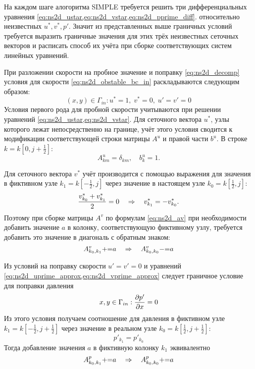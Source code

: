 На каждом шаге алогоритма SIMPLE требуется
решить три дифференциальных уравнения \cref{eq:ns2d_ustar,eq:ns2d_vstar,eq:ns2d_pprime_diff}.
относительно неизвестных $u^*, v^*, p'$.
Значит из представленных выше граничных условий требуется
выразить граничные значения для этих трёх неизвестных сеточных векторов
и расписать способ их учёта при сборке соответствующих систем линейных уравнений.

\label{sec:obstacle_bc_input}
При разложении скорости на пробное значение и поправку \cref{eq:ns2d_decomp}
условия для скорости \cref{eq:ns2d_obstable_bc_in} раскладываются следующим образом:
\begin{equation}
\label{eq:ns2d_decomp_input}
(x,y) \in \Gamma_{in}: u^* = 1, \; v^* = 0, \; u' = v' = 0
\end{equation}
Условия первого рода для пробной скорости учитываются при решении уравнений
\cref{eq:ns2d_ustar,eq:ns2d_vstar}.
Для сеточного вектора $u^*$, узлы которого лежат непосредственно на границе,
учёт этого условия сводится к модификации соответствующей строки матрицы $A^u$ и правой части $b^u$.
В строке $k=k\left[0, j+\tfrac12\right]$:
\begin{equation}
\label{eq:ns2d_au_bc_left}
A^u_{km} = \delta_{km}, \quad b^u_k = 1.
\end{equation}

Для сеточного вектора $v^*$ учёт производится с помощью выражения для значения в фиктивном узле $k_1 = k\left[-\tfrac12, j\right]$
через значение в настоящем узле $k_0 = k\left[\tfrac12, j\right]$:
$$
\frac{v^*_{k_0} + v^*_{k_1}}{2} = 0 \quad\Rightarrow\quad v^*_{k_1} = -v^*_{k_0}.
$$
Поэтому при сборке матрицы $A^v$ по формулам \cref{eq:ns2d_av} при необходимости добавить
значение $a$ в колонку, соответствующую фиктивному узлу, требуется добавить это значение
в диагональ с обратным знаком:
\begin{equation}
\label{eq:ns2d_av_bc_left}
A^v_{k_0, k_1} {{+}{=}} a \quad\Rightarrow\quad A^v_{k_0, k_0} {{-}{=}} a
\end{equation}

Из условий на поправку скорости $u'=v'=0$ и уравнений \cref{eq:ns2d_uprime_approx,eq:ns2d_vprime_approx}
следует граничное условие для поправки давления
\begin{equation}
\label{eq:ns2d_obstacle_bc_pres}
x,y\in\Gamma_{in}: \frac{\partial p'}{\partial x}=0
\end{equation}
Из этого условия получаем соотношение для давления в фиктивном узле $k_1 = k\left[-\tfrac12, j+\tfrac12\right]$
через значение  в реальном узле $k_0 = k\left[\tfrac12, j+\tfrac12\right]$:
$$
p'_{k_1} = p'_{k_0}
$$
Тогда добавление значения $a$ в фиктивную колонку $k_1$ эквивалентно
\begin{equation}
\label{eq:ns2d_ap_bc}
A^p_{k_0, k_1} {{+}{=}} a \quad\Rightarrow\quad A^p_{k_0, k_0} {{+}{=}} a
\end{equation}

